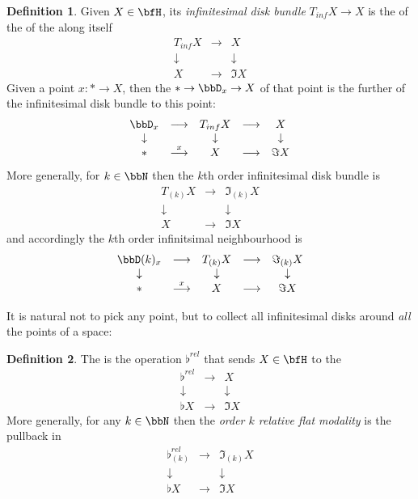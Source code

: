 \documentclass[12pt,titlepage]{article}
\newcommand{\itexarray}[1]{\begin{matrix}#1\end{matrix}}
\theoremstyle{plain}
\theoremstyle{definition}
\newtheorem{defn}{Definition}
\theoremstyle{remark}
\begin{document}
\begin{defn}
\label{InfinitesimalDiskBundle}\hypertarget{InfinitesimalDiskBundle}{}
Given $X \in \bfH$, its \emph{infinitesimal disk bundle} $T_{inf} X\to X$ is the  of the  of the  along itself
\begin{displaymath}
\itexarray{
T_{inf} X &\stackrel{}{\longrightarrow}& X
\\
\downarrow && \downarrow
\\
X &\longrightarrow& \Im X
}
\end{displaymath}
Given a point $x \colon  \ast \to X$, then the  $\ast \to \bbD_x \to X$ of that point is the further  of the infinitesimal disk bundle to this point:
\begin{displaymath}
\itexarray{
\bbD_x &\longrightarrow & T_{inf} X &\stackrel{}{\longrightarrow}& X
\\
\downarrow && \downarrow && \downarrow
\\
\ast &\stackrel{x}{\longrightarrow} & X &\longrightarrow& \Im X
}
\end{displaymath}
More generally, for $k \in \bbN$ then the $k$th order infinitesimal disk bundle is
\begin{displaymath}
\itexarray{
T_{(k)} X &\stackrel{}{\longrightarrow}& \Im_{(k)} X
\\
\downarrow && \downarrow
\\
X &\longrightarrow& \Im X
}
\end{displaymath}
and accordingly the $k$th order infinitsimal neighbourhood is
\begin{displaymath}
\itexarray{
\bbD(k)_x &\longrightarrow & T_{(k)} X &\stackrel{}{\longrightarrow}& \Im_{(k)}X
\\
\downarrow && \downarrow && \downarrow
\\
\ast &\stackrel{x}{\longrightarrow} & X &\longrightarrow& \Im X
}
\end{displaymath}
\end{defn}
It is natural not to pick any point, but to collect all infinitesimal disks around \emph{all} the points of a space:
\begin{defn}
\label{RelativeFlat}\hypertarget{RelativeFlat}{}
The  is the operation $\flat^{rel}$ that sends $X \in \bfH$ to the 
\begin{displaymath}
\itexarray{
\flat^{rel} &\longrightarrow& X
\\
\downarrow && \downarrow
\\
\flat X &\longrightarrow& \Im X
}
\end{displaymath}
More generally, for any $k \in \bbN$ then the \emph{order $k$ relative flat modality} is the pullback in
\begin{displaymath}
\itexarray{
\flat^{rel}_{(k)} &\longrightarrow& \Im_{(k)} X
\\
\downarrow && \downarrow
\\
\flat X &\longrightarrow& \Im X
}
\end{displaymath}
\end{defn}
\end{document}
